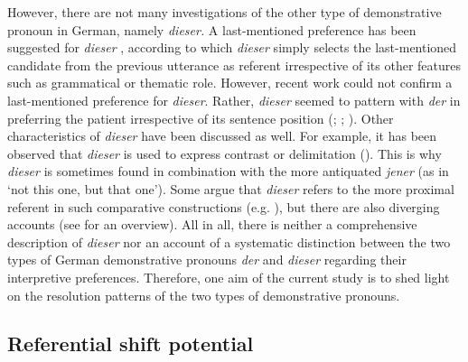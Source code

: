 \documentclass[output=paper,colorlinks,citecolor=brown]{langscibook}
\begin{document}
However, there are not many investigations of the other type of demonstrative pronoun in German, namely \textit{dieser.} A last-mentioned preference has been suggested for \textit{dieser} \citep{ZifonunEtAl1997}, according to which \textit{dieser} simply selects the last-mentioned candidate from the previous utterance as referent irrespective of its other features such as grammatical or thematic role. However, recent work could not confirm a last-mentioned preference for \textit{dieser}. Rather, \textit{dieser} seemed to pattern with \textit{der} in preferring the patient irrespective of its sentence position (\citealt{Lange2016}; \citealt{Özden2016}; \citealt{PatilEtAl2020}). Other characteristics of \textit{dieser} have been discussed as well. For example, it has been observed that \textit{dieser} is used to express contrast or delimitation (\citealt{Bisle-Müller1991}). This is why \textit{dieser} is sometimes found in combination with the more antiquated \textit{jener} (as in ‘not this one, but that one’). Some argue that \textit{dieser} refers to the more proximal referent in such comparative constructions (e.g. \citealt{Bisle-Müller1991}), but there are also diverging accounts (see \citealt{Ahrenholz2007} for an overview). All in all, there is neither a comprehensive description of \textit{dieser} nor an account of a systematic distinction between the two types of German demonstrative pronouns \textit{der} and \textit{dieser} regarding their interpretive preferences. Therefore, one aim of the current study is to shed light on the resolution patterns of the two types of demonstrative pronouns.

\subsection{Referential shift potential}\label{sec:fuchs:1.3}
\end{document}
